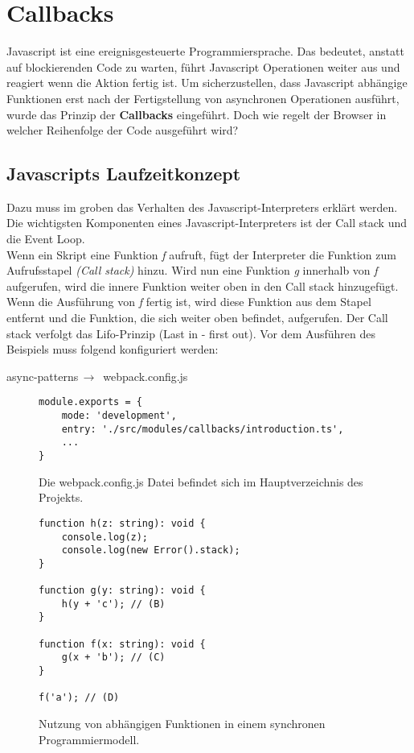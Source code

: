 \section{Callbacks}
Javascript ist eine ereignisgesteuerte Programmiersprache. Das bedeutet, anstatt auf blockierenden Code zu warten, führt Javascript Operationen weiter aus und reagiert wenn die Aktion fertig ist. Um sicherzustellen, dass Javascript abhängige Funktionen erst nach der Fertigstellung von asynchronen Operationen ausführt, wurde das Prinzip der \textbf{Callbacks} eingeführt. Doch wie regelt der Browser in welcher Reihenfolge der Code ausgeführt wird?

\subsection{Javascripts Laufzeitkonzept}
Dazu muss im groben das Verhalten des Javascript-Interpreters erklärt werden. Die wichtigsten Komponenten eines Javascript-Interpreters ist der Call stack und die Event Loop.\\

\noindent
Wenn ein Skript eine Funktion \textit{f} aufruft, fügt der Interpreter die Funktion zum Aufrufsstapel \textit{(Call stack)} hinzu. Wird nun eine Funktion \textit{g} innerhalb von \textit{f} aufgerufen, wird die innere Funktion weiter oben in den Call stack hinzugefügt. Wenn die Ausführung von \textit{f} fertig ist, wird diese Funktion aus dem Stapel entfernt und die Funktion, die sich weiter oben befindet, aufgerufen. Der Call stack verfolgt das Lifo-Prinzip (Last in - first out)\cite{javascript-interpreter}. Vor dem Ausführen des Beispiels muss folgend konfiguriert werden:

\begin{center}
    async-patterns$\,\to\,$ webpack.config.js
\end{center}

\begin{figure}[H]
\begin{lstlisting}[basicstyle=\small]
module.exports = {
    mode: 'development',
    entry: './src/modules/callbacks/introduction.ts',
    ...
}
\end{lstlisting}
\caption{Die webpack.config.js Datei befindet sich im Hauptverzeichnis des Projekts.}
\end{figure}

\begin{figure}[H]
\begin{lstlisting}[basicstyle=\small]
function h(z: string): void {
    console.log(z);
    console.log(new Error().stack);
}

function g(y: string): void {
    h(y + 'c'); // (B)
}

function f(x: string): void {
    g(x + 'b'); // (C)
}

f('a'); // (D)
\end{lstlisting}
\caption{Nutzung von abhängigen Funktionen in einem synchronen Programmiermodell.}
\end{figure}

